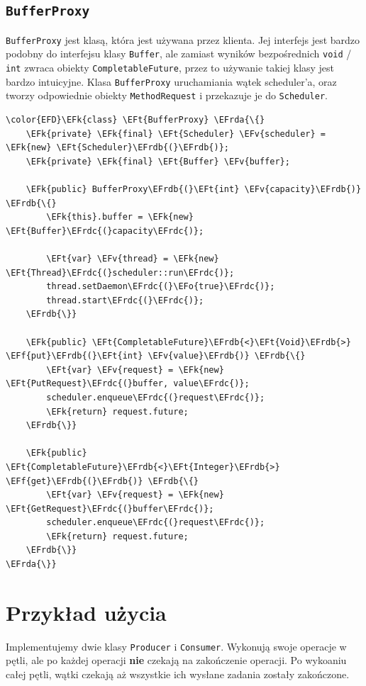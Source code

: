 \documentclass[11pt]{article}
\newcommand{\EFk}[1]{\textcolor{EFk}{#1}} %
\newcommand{\EFf}[1]{\textcolor{EFf}{#1}} %
\newcommand{\EFv}[1]{\textcolor{EFv}{#1}} %
\newcommand{\EFt}[1]{\textcolor{EFt}{#1}} %
\newcommand{\EFo}[1]{\textcolor{EFo}{#1}} %
\newcommand{\EFrda}[1]{\textcolor{EFrda}{#1}} %
\newcommand{\EFrdb}[1]{\textcolor{EFrdb}{#1}} %
\newcommand{\EFrdc}[1]{\textcolor{EFrdc}{#1}} %
\begin{document}
\subsection*{\texttt{BufferProxy}}
\label{sec:org3867074}
\texttt{BufferProxy} jest klasą, która jest używana przez klienta.
Jej interfejs jest bardzo podobny do interfejsu klasy \texttt{Buffer}, ale zamiast
wyników bezpośrednich \texttt{void} / \texttt{int} zwraca obiekty \texttt{CompletableFuture}, przez
to używanie takiej klasy jest bardzo intuicyjne.
Klasa \texttt{BufferProxy} uruchamiania wątek scheduler'a, oraz tworzy odpowiednie obiekty
\texttt{MethodRequest} i przekazuje je do \texttt{Scheduler}.

\begin{Code}
\begin{Verbatim}
\color{EFD}\EFk{class} \EFt{BufferProxy} \EFrda{\{}
    \EFk{private} \EFk{final} \EFt{Scheduler} \EFv{scheduler} = \EFk{new} \EFt{Scheduler}\EFrdb{(}\EFrdb{)};
    \EFk{private} \EFk{final} \EFt{Buffer} \EFv{buffer};

    \EFk{public} BufferProxy\EFrdb{(}\EFt{int} \EFv{capacity}\EFrdb{)} \EFrdb{\{}
        \EFk{this}.buffer = \EFk{new} \EFt{Buffer}\EFrdc{(}capacity\EFrdc{)};

        \EFt{var} \EFv{thread} = \EFk{new} \EFt{Thread}\EFrdc{(}scheduler::run\EFrdc{)};
        thread.setDaemon\EFrdc{(}\EFo{true}\EFrdc{)};
        thread.start\EFrdc{(}\EFrdc{)};
    \EFrdb{\}}

    \EFk{public} \EFt{CompletableFuture}\EFrdb{<}\EFt{Void}\EFrdb{>} \EFf{put}\EFrdb{(}\EFt{int} \EFv{value}\EFrdb{)} \EFrdb{\{}
        \EFt{var} \EFv{request} = \EFk{new} \EFt{PutRequest}\EFrdc{(}buffer, value\EFrdc{)};
        scheduler.enqueue\EFrdc{(}request\EFrdc{)};
        \EFk{return} request.future;
    \EFrdb{\}}

    \EFk{public} \EFt{CompletableFuture}\EFrdb{<}\EFt{Integer}\EFrdb{>} \EFf{get}\EFrdb{(}\EFrdb{)} \EFrdb{\{}
        \EFt{var} \EFv{request} = \EFk{new} \EFt{GetRequest}\EFrdc{(}buffer\EFrdc{)};
        scheduler.enqueue\EFrdc{(}request\EFrdc{)};
        \EFk{return} request.future;
    \EFrdb{\}}
\EFrda{\}}
\end{Verbatim}
\end{Code}
\section*{Przykład użycia}
\label{sec:org46eeb2e}
Implementujemy dwie klasy \texttt{Producer} i \texttt{Consumer}.
Wykonują swoje operacje w pętli, ale po każdej operacji \textbf{nie} czekają
na zakończenie operacji. Po wykoaniu całej pętli, wątki czekają aż wszystkie
ich wysłane zadania zostały zakończone.
\end{document}
